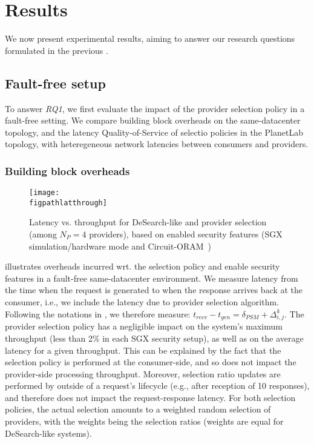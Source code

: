 \section{Results}\label{sec:results}

We now present experimental results, aiming to answer our research questions formulated in the previous .

\subsection{Fault-free setup}\label{ssec:res-FFPL}

To answer \emph{RQ1}, we first evaluate the impact of the provider selection policy in a fault-free setting.
We compare building block overheads on the same-datacenter topology, and the latency Quality-of-Service of selectio policies in the PlanetLab topology, with heteregeneous network latencies between consumers and providers.

\subsubsection{Building block overheads}\label{ssec:res-bbo}
\begin{figure}
    \centering
    \texttt{[image: \\figpathlatthrough]}
    \caption{Latency vs. throughput for DeSearch-like and \sysname provider selection (among $N_{P}=4$ providers), based on enabled security features (SGX simulation/hardware mode and Circuit-ORAM~\cite{wangCircuitORAMTightness2015})}
    \label{fig:ff-lat-through}
\end{figure}
 illustrates overheads incurred wrt. the selection policy and enable security features in a fault-free same-datacenter environment.
We measure latency from the time when the request is generated to when the response arrives back at the consumer, i.e., we include the latency due to provider selection algorithm.
Following the notations in , we therefore measure: $t_{recv}-t_{gen}=\delta_{PSM}+\Delta^{k}_{i,j}$.
The provider selection policy has a negligible impact on the system's maximum throughput (less than 2\% in each SGX security setup), as well as on the average latency for a given throughput.
This can be explained by the fact that the selection policy is performed at the consumer-side, and so does not impact the provider-side processing throughput.
Moreover, selection ratio updates are performed by \sysname outside of a request's lifecycle (e.g., after reception of 10 responses), and therefore does not impact the request-response latency.
For both selection policies, the actual selection amounts to a weighted random selection of providers, with the weights being the selection ratios (weights are equal for DeSearch-like systems).

